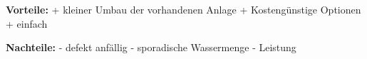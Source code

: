 \textbf{Vorteile:}												\newline
+	kleiner Umbau der vorhandenen Anlage			\newline
+	Kostengünstige Optionen								\newline
+	einfach															\newline
	
\textbf{Nachteile:}												\newline
- 	defekt anfällig												\newline
-	sporadische Wassermenge							\newline
-	Leistung														\newline


